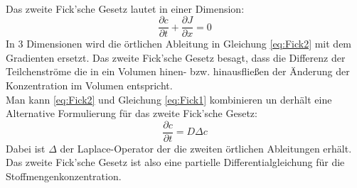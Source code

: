 \documentclass[11pt,a4paper]{article}
\numberwithin{equation}{section}
\numberwithin{figure}{section}
\begin{document}
\\
\begin{addmargin}[25pt]{0pt}
Das zweite Fick'sche Gesetz lautet in einer Dimension:
\begin{equation}\label{eq:Fick2}
    \frac{\partial c}{\partial t} + \frac{\partial J}{\partial x} = 0
\end{equation}
In 3 Dimensionen wird die örtlichen Ableitung in Gleichung \ref{eq:Fick2} mit dem Gradienten ersetzt. Das zweite Fick'sche Gesetz besagt, dass die Differenz der Teilchenströme die in ein Volumen hinen- bzw. hinausfließen der Änderung der Konzentration im Volumen entspricht.\\
Man kann \ref{eq:Fick2} und Gleichung \ref{eq:Fick1} kombinieren un derhält eine Alternative Formulierung für das zweite Fick'sche Gesetz:
\begin{equation}\label{eq:Fick2_Alternative}
    \frac{\partial c}{\partial t} = D \Delta c
\end{equation}
Dabei ist $\Delta$ der Laplace-Operator der die zweiten örtlichen Ableitungen erhält. Das zweite Fick'sche Gesetz ist also eine partielle Differentialgleichung für die Stoffmengenkonzentration.\\
\end{addmargin} 
\end{document}

